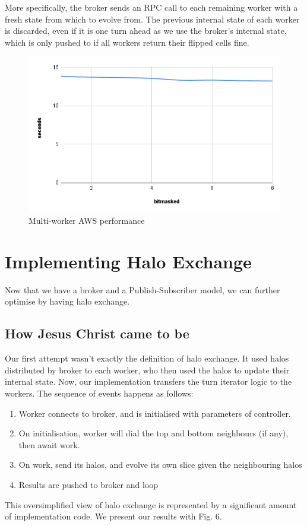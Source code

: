 \documentclass[twoside,twocolumn]{article}
\begin{document}
More specifically, the broker sends an RPC call to each remaining worker with a fresh state from which to 
evolve from. The previous internal state of each worker is discarded, even if it is one turn ahead as we use the broker's
internal state, which is only pushed to if all workers return their flipped cells fine.
\begin{figure}
  \includegraphics[width=\linewidth]{halo.png}
  \caption{Multi-worker AWS performance}
  \label{fig:chart7}
\end{figure}

\section{Implementing Halo Exchange}
Now that we have a broker and a Publish-Subscriber model, we can further optimise by having halo exchange.
\subsection{How Jesus Christ came to be}
Our first attempt wasn't exactly the definition of halo exchange. It used halos distributed by broker to
each worker, who then used the halos to update their internal state. Now, our implementation transfers the turn iterator
logic to the workers. The sequence of events happens as follows:
\begin{enumerate}[noitemsep]
  \item Worker connects to broker, and is initialised with parameters of controller.
  \item On initialisation, worker will dial the top and bottom neighbours (if any), then await work.
  \item On work, send its halos, and evolve its own slice given the neighbouring halos
  \item Results are pushed to broker and loop
\end{enumerate}
This oversimplified view of halo exchange is represented by a significant amount of implementation code.
We present our results with Fig. 6.
\end{document}

